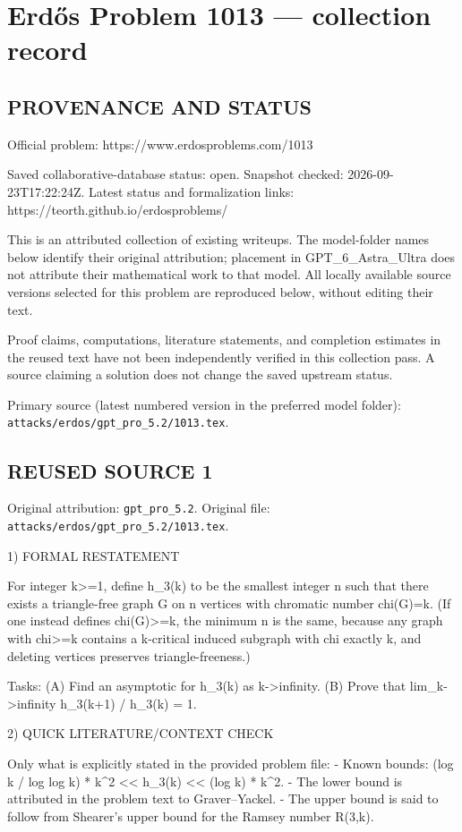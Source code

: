\section*{Erd\H{o}s Problem 1013 --- collection record}

\subsection*{PROVENANCE AND STATUS}
Official problem: https://www.erdosproblems.com/1013

Saved collaborative-database status: open.
Snapshot checked: 2026-09-23T17:22:24Z.
Latest status and formalization links: https://teorth.github.io/erdosproblems/

This is an attributed collection of existing writeups. The model-folder names below identify their original attribution; placement in GPT\_6\_Astra\_Ultra does not attribute their mathematical work to that model. All locally available source versions selected for this problem are reproduced below, without editing their text.

Proof claims, computations, literature statements, and completion estimates in the reused text have not been independently verified in this collection pass. A source claiming a solution does not change the saved upstream status.

Primary source (latest numbered version in the preferred model folder): \texttt{attacks/erdos/gpt\_pro\_5.2/1013.tex}.

\subsection*{REUSED SOURCE 1}
Original attribution: \texttt{gpt\_pro\_5.2}.
Original file: \texttt{attacks/erdos/gpt\_pro\_5.2/1013.tex}.


1) FORMAL RESTATEMENT

For integer k>=1, define h_3(k) to be the smallest integer n such that there exists a triangle-free graph G on n vertices with chromatic number chi(G)=k.
(If one instead defines chi(G)>=k, the minimum n is the same, because any graph with chi>=k contains a k-critical induced subgraph with chi exactly k, and deleting vertices preserves triangle-freeness.)

Tasks:
(A) Find an asymptotic for h_3(k) as k->infinity.
(B) Prove that
  lim_{k->infinity} h_3(k+1) / h_3(k) = 1.

2) QUICK LITERATURE/CONTEXT CHECK

Only what is explicitly stated in the provided problem file:
- Known bounds:
    (log k / log log k) * k^2 << h_3(k) << (log k) * k^2.
- The lower bound is attributed in the problem text to Graver--Yackel.
- The upper bound is said to follow from Shearer's upper bound for the Ramsey number R(3,k).

